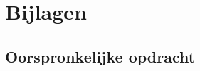 \documentclass{article}
\begin{document}


\newpage

\section{Bijlagen}

\subsection{Oorspronkelijke opdracht}
\end{document}
